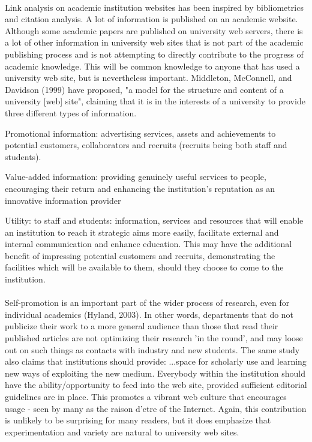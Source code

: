 \paragraph{}
Link analysis on academic institution websites has been inspired by bibliometrics and citation
analysis. A lot of information is published on an academic website. Although some academic papers are published on university web servers, there is a lot of other information in university web sites that is not part of the academic publishing process and is not attempting to directly contribute to the progress of academic knowledge. This will be common knowledge to anyone that has used a university web site, but is nevertheless important. Middleton, McConnell, and Davidson (1999) have proposed, "a model for the structure and content of a university [web] site", claiming that it is in the interests of a university to provide three different types of information.
\begin{list}{}{}
\item Promotional information: advertising services, assets and achievements to potential customers, collaborators and recruits (recruits being both staff and students).
\item Value-added information: providing genuinely useful services to people, encouraging their return and enhancing the institution's reputation as an innovative information provider
\item Utility: to staff and students: information, services and resources that will enable an institution to reach it strategic aims more easily, facilitate external and internal communication and enhance education. This may have the additional benefit of impressing potential customers and recruits, demonstrating the facilities which will be available to them, should they choose to come to the institution.
\end{list}
\paragraph{}
Self-promotion is an important part of the wider process of research, even for individual academics (Hyland, 2003). In other words, departments that do not publicize their work to a more general audience than those that read their published articles are not optimizing their research 'in the round', and may loose out on such things as contacts with industry and new students. The same study also claims that institutions should provide:
...space for scholarly use and learning new ways of exploiting the new medium. Everybody within the institution should have the ability/opportunity to feed into the web site, provided sufficient editorial guidelines are in place.
This promotes a vibrant web culture that encourages usage - seen by many as the raison d'etre of the Internet.
Again, this contribution is unlikely to be surprising for many readers, but it does emphasize that experimentation and variety are natural to university web sites.

